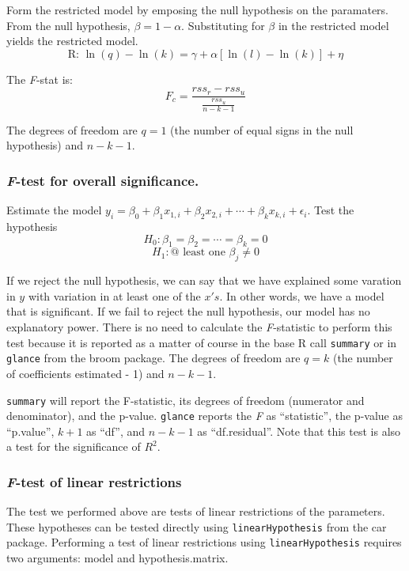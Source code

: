 \documentclass[]{book}
\begin{document}
Form the restricted model by emposing the null hypothesis on the paramaters. From the null hypothesis, \(\beta=1-\alpha\). Substituting for \(\beta\) in the restricted model yields the restricted model. \[\text{R: }\ln(q)-\ln(k)=\gamma+\alpha[\ln(l)-\ln(k)]+\eta\]

The \emph{F}-stat is: \[F_c=\frac{rss_r-rss_u}{\frac{rss_u}{n-k-1}}\]

The degrees of freedom are \(q=1\) (the number of equal signs in the null hypothesis) and \(n-k-1\).

\hypertarget{f-test-for-overall-significance.}{%
\subsubsection{\texorpdfstring{\emph{F}-test for overall significance.}{F-test for overall significance.}}\label{f-test-for-overall-significance.}}

Estimate the model \(y_i=\beta_0+\beta_1x_{1,i}+\beta_2x_{2,i}+\cdots+\beta_kx_{k,i}+\epsilon_i\). Test the hypothesis \[H_0: \beta_1=\beta_2=\cdots=\beta_k=0\] \[H_1:\text{@ least one }\beta_j\ne0\]

If we reject the null hypothesis, we can say that we have explained some varation in \(y\) with variation in at least one of the \(x's\). In other words, we have a model that is significant. If we fail to reject the null hypothesis, our model has no explanatory power. There is no need to calculate the \emph{F}-statistic to perform this test because it is reported as a matter of course in the base R call \texttt{summary} or in \texttt{glance} from the broom package. The degrees of freedom are \(q=k\) (the number of coefficients estimated - 1) and \(n-k-1\).

\texttt{summary} will report the F-statistic, its degrees of freedom (numerator and denominator), and the p-value. \texttt{glance} reports the \emph{F} as ``statistic'', the p-value as ``p.value'', \(k+1\) as ``df'', and \(n-k-1\) as ``df.residual''. Note that this test is also a test for the significance of \(R^2\).

\hypertarget{f-test-of-linear-restrictions}{%
\subsubsection{\texorpdfstring{\emph{F}-test of linear restrictions}{F-test of linear restrictions}}\label{f-test-of-linear-restrictions}}

The test we performed above are tests of linear restrictions of the parameters. These hypotheses can be tested directly using \texttt{linearHypothesis} from the car package. Performing a test of linear restrictions using \texttt{linearHypothesis} requires two arguments: model and hypothesis.matrix.
\end{document}
